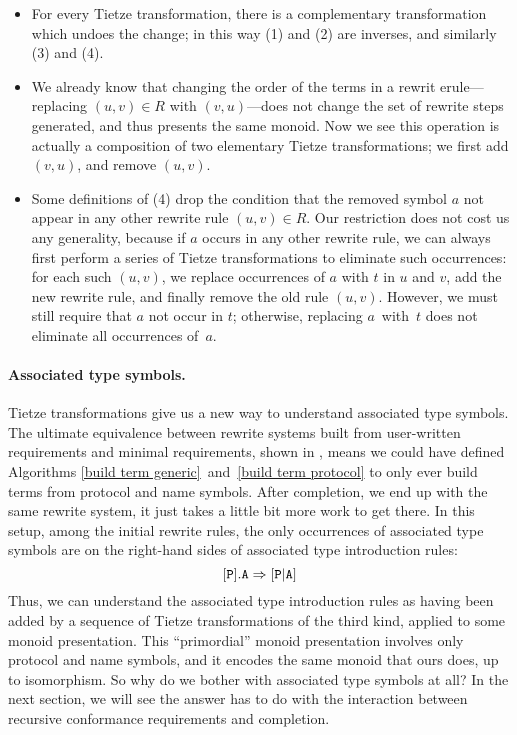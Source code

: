 \documentclass[../generics]{subfiles}
\begin{document}
\begin{itemize}
\item For every Tietze transformation, there is a complementary transformation which undoes the change; in this way (1) and (2) are inverses, and similarly (3) and (4).

\item We already know that changing the order of the terms in a rewrit erule---replacing $(u,v)\in R$ with $(v,u)$---does not change the set of rewrite steps generated, and thus presents the same monoid. Now we see this operation is actually a composition of two elementary Tietze transformations; we first add $(v,u)$, and remove $(u,v)$.

\item Some definitions of (4) drop the condition that the removed symbol $a$ not appear in any other rewrite rule $(u,v)\in R$. Our restriction does not cost us any generality, because if $a$ occurs in any other rewrite rule, we can always first perform a series of Tietze transformations to eliminate such occurrences: for each such $(u,v)$, we replace occurrences of $a$ with $t$ in $u$ and $v$, add the new rewrite rule, and finally remove the old rule $(u,v)$. However, we must still require that $a$ not occur in $t$; otherwise, replacing $a$~with~$t$ does not eliminate all occurrences of~$a$.
\end{itemize}

\paragraph{Associated type symbols.} Tietze transformations give us a new way to understand associated type symbols. The ultimate equivalence between rewrite systems built from user-written requirements and minimal requirements, shown in , means we could have defined Algorithms \ref{build term generic}~and~\ref{build term protocol} to only ever build terms from protocol and name symbols. After completion, we end up with the same rewrite system, it just takes a little bit more work to get there. In this setup, among the initial rewrite rules, the only occurrences of associated type symbols are on the right-hand sides of associated type introduction rules:
\[[\texttt{P}].\texttt{A}\Rightarrow[\texttt{P}|\texttt{A}]\]
Thus, we can understand the associated type introduction rules as having been added by a sequence of Tietze transformations of the third kind, applied to some monoid presentation. This ``primordial'' monoid presentation involves only protocol and name symbols, and it encodes the same monoid that ours does, up to isomorphism. So why do we bother with associated type symbols at all? In the next section, we will see the answer has to do with the interaction between recursive conformance requirements and completion.
\end{document}
